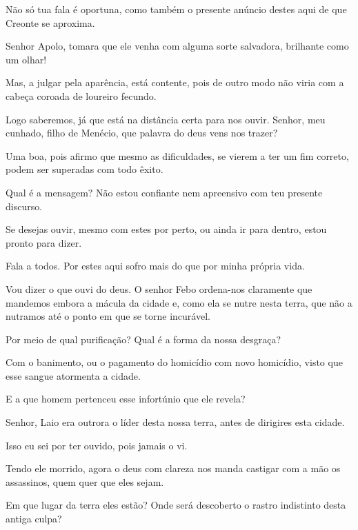    Não só tua fala é oportuna, como também o presente anúncio destes aqui
de que Creonte se aproxima.

   Senhor Apolo, tomara que ele venha com alguma sorte salvadora,
brilhante como um olhar!

   Mas, a julgar pela aparência, está contente, pois de outro modo não
viria com a cabeça coroada de loureiro fecundo.

   Logo saberemos, já que está na distância certa para nos ouvir. Senhor,
meu cunhado, filho de Menécio, que palavra do deus vens nos trazer?


   Uma boa, pois afirmo que mesmo as dificuldades, se vierem a ter um fim
correto, podem ser superadas com todo êxito.

   Qual é a mensagem? Não estou confiante nem apreensivo com teu
presente discurso.

   Se desejas ouvir, mesmo com estes por perto, ou ainda ir para dentro,
estou pronto para dizer.



   Fala a todos. Por estes aqui sofro mais do que por minha própria vida.

   Vou dizer o que ouvi do deus. O senhor Febo ordena-nos claramente que
mandemos embora a mácula da cidade e, como ela se nutre nesta terra, que
não a nutramos até o ponto em que se torne incurável.

   Por meio de qual purificação? Qual é a forma da nossa desgraça?

   Com o banimento, ou o pagamento do homicídio com novo homicídio,
visto que esse sangue atormenta a cidade.

   E a que homem pertenceu esse infortúnio que ele revela?

   Senhor, Laio era outrora o líder desta nossa terra, antes de dirigires
esta cidade.

   Isso eu sei por ter ouvido, pois jamais o vi.

   Tendo ele morrido, agora o deus com clareza nos manda castigar com a mão
os assassinos, quem quer que eles sejam.

   Em que lugar da terra eles estão? Onde será descoberto o rastro
indistinto desta antiga culpa?

